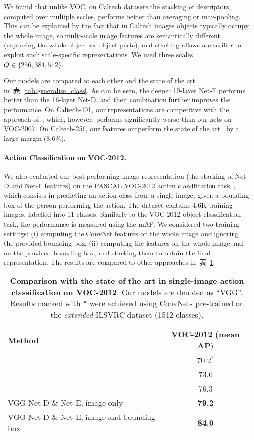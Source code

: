 \documentclass{article} %
\makeatletter
\newcommand{\tblref}[1]{表~\ref{#1}}
\newcommand*{\vs}{\emph{vs}.\@\xspace}
\makeatother
\begin{document}
We found that unlike VOC, on Caltech datasets the stacking of descriptors, computed over multiple scales, performs better than averaging or max-pooling. 
This can be explained by the fact that in Caltech images objects typically occupy the whole image, so multi-scale image features are semantically different (capturing the whole object \vs object parts), and stacking allows a classifier to exploit such scale-specific representations. We used three scales $Q \in \{256,384,512\}$.

Our models are compared to each other and the state of the art in~\tblref{tab:generalise_class}. 
As can be seen, the deeper 19-layer Net-E performs better than the 16-layer Net-D, and their combination further improves the performance.
On Caltech-101, our representations are competitive with the approach of~\citet{He14}, which, however, performs significantly worse than our nets on VOC-2007. On Caltech-256, our features outperform the state of the art~\citep{Chatfield14} by a large margin ($8.6\%$). 

\paragraph{Action Classification on VOC-2012.}
We also evaluated our best-performing image representation (the stacking of Net-D and Net-E features) on the PASCAL VOC-2012 action classification task~\citep{Everingham15}, which consists in predicting an action class from a single image, given a bounding box of the person performing the action. The dataset contains 4.6K training images, labelled into 11 classes. Similarly to the VOC-2012 object classification task, the performance is measured using the mAP. We considered two training settings: 
(i) computing the ConvNet features on the whole image and ignoring the provided bounding box;
(ii) computing the features on the whole image and on the provided bounding box, and stacking them to obtain the final representation.
The results are compared to other approaches in~\tblref{tab:generalise_action}.
\begin{table}[htb]
\setlength{\tabcolsep}{2pt}
\small
\centering
\caption{\textbf{Comparison with the state of the art in single-image action classification on VOC-2012}.
Our models are denoted as ``VGG''. 
Results marked with * were achieved using \mbox{ConvNets} pre-trained on the \emph{extended} ILSVRC dataset (1512 classes).
}
\begin{tabular}{|l|c|} \hline
Method & VOC-2012 (mean AP) \\ \hline
\citep{Oquab14} & 70.2$^*$ \\ \hline
\citep{Gkioxari14} & 73.6 \\ \hline
\citep{Hoai14a} & 76.3 \\ \hline\hline
VGG Net-D \& Net-E, image-only & \textbf{79.2} \\ \hline
VGG Net-D \& Net-E, image and bounding box & \textbf{84.0} \\ \hline
\end{tabular}
\label{tab:generalise_action}
\end{table}
\end{document}
